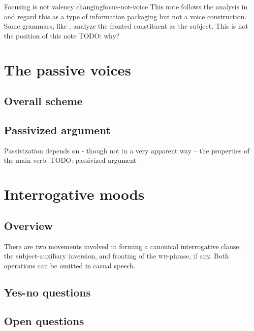 \documentclass[UTF8, a4paper, oneside, scheme=plain]{ctexrep}
\newcommand*{\citepage}[1]{pp.~{#1}}
\newcommand{\corpuscat}[1]{\textsc{#1}}
\begin{document}
\begin{infobox}{Focusing is not valency changing}{focus-not-voice}
    This note follows the analysis in \citet[\citepage{244}]{cgel}
    and regard this as a type of information packaging
    but not a voice construction.
    Some grammars, like \citet[\citepage{736}]{quirk1985},
    analyze the fronted constituent as the subject. 
    This is not the position of this note TODO: why?
\end{infobox}

\section{The passive voices}\label{sec:simple-clause.voice}

\subsection{Overall scheme}

\subsection{Passivized argument}

Passivization depends on - though not in a very apparent way -- the properties of the main verb. 
TODO: passivized argument



\section{Interrogative moods}

\subsection{Overview}\label{sec:simple-clause.interrogative.formation}

There are two movements involved in forming a canonical interrogative clause:
the subject-auxiliary inversion,
and fronting of the \corpuscat{wh}-phrase, if any.
Both operations can be omitted in casual speech.

\subsection{Yes-no questions}

\subsection{Open questions}
\end{document}
